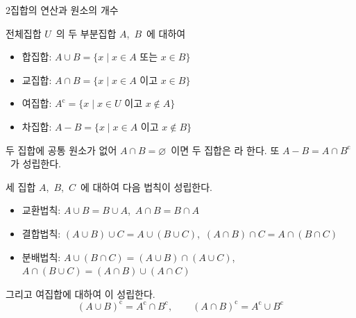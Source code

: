 \documentclass[10pt]{article}
\begin{document}
\newpage

\dmconcepthead
{}

\begin{dmconcept}{2}{집합의 연산과 원소의 개수}
\setlength{\parskip}{1.9mm plus 2.0mm minus 0mm}\linespread{1.29}\selectfont%


전체집합 $U$\ 의 두 부분집합 $A$,\ $B$\ 에 대하여
\begin{itemize}[leftmargin=8mm, itemsep=0.4mm, topsep=0.8mm]
  \item 합집합: $A \cup B = \{x \mid x \in A \text{ 또는 } x \in B\}$
  \item 교집합: $A \cap B = \{x \mid x \in A \text{ 이고 } x \in B\}$
  \item 여집합: $A^\mathrm{c} = \{x \mid x \in U \text{ 이고 } x \notin A\}$
  \item 차집합: $A - B = \{x \mid x \in A \text{ 이고 } x \notin B\}$
\end{itemize}

두 집합에 공통 원소가 없어 $A \cap B = \varnothing$\ 이면 두 집합은 라 한다. 또 $A - B = A \cap B^\mathrm{c}$\ 가 성립한다.


세 집합 $A$,\ $B$,\ $C$\ 에 대하여 다음 법칙이 성립한다.
\begin{itemize}[leftmargin=8mm, itemsep=0.4mm, topsep=0.8mm]
  \item 교환법칙: $A \cup B = B \cup A$,\ $A \cap B = B \cap A$
  \item 결합법칙: $(A \cup B) \cup C = A \cup (B \cup C)$,\ $(A \cap B) \cap C = A \cap (B \cap C)$
  \item 분배법칙: $A \cup (B \cap C) = (A \cup B) \cap (A \cup C)$,\ $A \cap (B \cup C) = (A \cap B) \cup (A \cap C)$
\end{itemize}

그리고 여집합에 대하여 이 성립한다.
\begin{equation*}
  (A \cup B)^\mathrm{c} = A^\mathrm{c} \cap B^\mathrm{c}, \qquad (A \cap B)^\mathrm{c} = A^\mathrm{c} \cup B^\mathrm{c}
\end{equation*}



\end{dmconcept}
\end{document}
